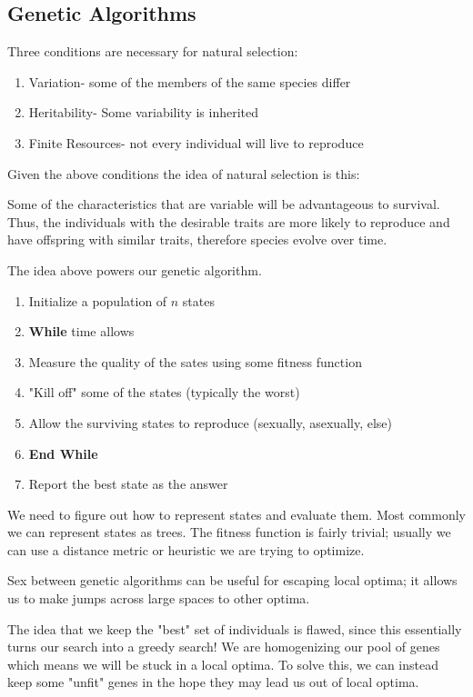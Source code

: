 \documentclass{chezarticle}
\begin{document}
\subsection{Genetic Algorithms}
Three conditions are necessary for natural selection:
\begin{enumerate}
    \item Variation- some of the members of the same species differ
    \item Heritability- Some variability is inherited
    \item Finite Resources- not every individual will live to reproduce
\end{enumerate}
Given the above conditions the idea of natural selection is this:
\begin{definition}
Some of the characteristics that are variable will be advantageous to survival. Thus, the individuals with the desirable traits are more likely to reproduce and have offspring with similar traits, therefore species evolve over time.
\end{definition}
The idea above powers our genetic algorithm.
\begin{algorithm}
\begin{enumerate}
    \item Initialize a population of $n$ states
    \item \textbf{While} time allows
    \item Measure the quality of the sates using some fitness function
    \item "Kill off" some of the states (typically the worst)
    \item Allow the surviving states to reproduce (sexually, asexually, else)
    \item \textbf{End While}
    \item Report the best state as the answer
\end{enumerate}
\end{algorithm}
We need to figure out how to represent states and evaluate them. Most commonly we can represent states as trees. The fitness function is fairly trivial; usually we can use a distance metric or heuristic we are trying to optimize. 
\begin{proposition}
Sex between genetic algorithms can be useful for escaping local optima; it allows us to make jumps across large spaces to other optima.
\end{proposition}
The idea that we keep the "best" set of individuals is flawed, since this essentially turns our search into a greedy search! We are homogenizing our pool of genes which means we will be stuck in a local optima. To solve this, we can instead keep some "unfit" genes in the hope they may lead us out of local optima. 
\end{document}
